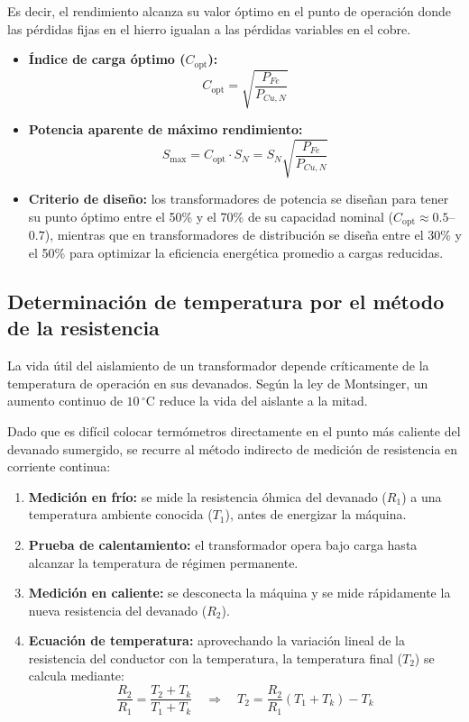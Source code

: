 \documentclass[12pt]{article}
\begin{document}
Es decir, el rendimiento alcanza su valor \'optimo en el punto de operaci\'on donde las p\'erdidas fijas en el hierro igualan a las p\'erdidas variables en el cobre.
\begin{itemize}
    \item \textbf{\'Indice de carga \'optimo ($C_{\text{opt}}$):}
    \begin{equation}
        C_{\text{opt}} = \sqrt{\frac{P_{Fe}}{P_{Cu,N}}}
    \end{equation}
    \item \textbf{Potencia aparente de m\'aximo rendimiento:}
    \begin{equation}
        S_{\text{max}} = C_{\text{opt}} \cdot S_N
        = S_N \sqrt{\frac{P_{Fe}}{P_{Cu,N}}}
    \end{equation}
    \item \textbf{Criterio de dise\~no:} los transformadores de potencia se dise\~nan para tener su punto \'optimo entre el 50\% y el 70\% de su capacidad nominal ($C_{\text{opt}} \approx 0.5$--$0.7$), mientras que en transformadores de distribuci\'on se dise\~na entre el 30\% y el 50\% para optimizar la eficiencia energ\'etica promedio a cargas reducidas.
\end{itemize}

\subsection{Determinaci\'on de temperatura por el m\'etodo de la resistencia}
La vida \'util del aislamiento de un transformador depende cr\'iticamente de la temperatura de operaci\'on en sus devanados. Seg\'un la ley de Montsinger, un aumento continuo de $10\,^{\circ}\mathrm{C}$ reduce la vida del aislante a la mitad.

Dado que es dif\'icil colocar term\'ometros directamente en el punto m\'as caliente del devanado sumergido, se recurre al m\'etodo indirecto de medici\'on de resistencia en corriente continua:
\begin{enumerate}
    \item \textbf{Medici\'on en fr\'io:} se mide la resistencia \'ohmica del devanado ($R_1$) a una temperatura ambiente conocida ($T_1$), antes de energizar la m\'aquina.
    \item \textbf{Prueba de calentamiento:} el transformador opera bajo carga hasta alcanzar la temperatura de r\'egimen permanente.
    \item \textbf{Medici\'on en caliente:} se desconecta la m\'aquina y se mide r\'apidamente la nueva resistencia del devanado ($R_2$).
    \item \textbf{Ecuaci\'on de temperatura:} aprovechando la variaci\'on lineal de la resistencia del conductor con la temperatura, la temperatura final ($T_2$) se calcula mediante:
    \begin{equation}
        \frac{R_2}{R_1} = \frac{T_2 + T_k}{T_1 + T_k}
        \quad\Longrightarrow\quad
        T_2 = \frac{R_2}{R_1}(T_1 + T_k) - T_k
    \end{equation}
\end{enumerate}
\end{document}
